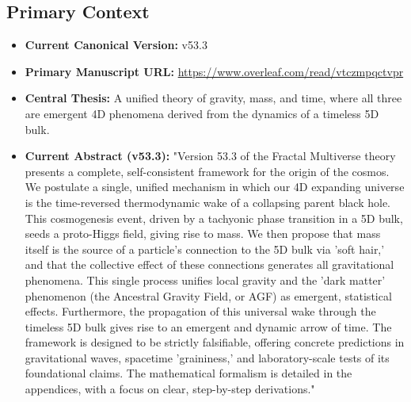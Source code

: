 \documentclass[aps,prd,onecolumn,10pt,superscriptaddress,nofootinbib,floatfix]{revtex4-2}
\begin{document}
\subsection{Primary Context}
\begin{itemize}
    \item \textbf{Current Canonical Version:} v53.3
    \item \textbf{Primary Manuscript URL:} \url{https://www.overleaf.com/read/vtczmpqctvpr}
    \item \textbf{Central Thesis:} A unified theory of gravity, mass, and time, where all three are emergent 4D phenomena derived from the dynamics of a timeless 5D bulk.
    \item \textbf{Current Abstract (v53.3):} "Version 53.3 of the Fractal Multiverse theory presents a complete, self-consistent framework for the origin of the cosmos. We postulate a single, unified mechanism in which our 4D expanding universe is the time-reversed thermodynamic wake of a collapsing parent black hole. This cosmogenesis event, driven by a tachyonic phase transition in a 5D bulk, seeds a proto-Higgs field, giving rise to mass. We then propose that mass itself is the source of a particle's connection to the 5D bulk via 'soft hair,' and that the collective effect of these connections generates all gravitational phenomena. This single process unifies local gravity and the 'dark matter' phenomenon (the Ancestral Gravity Field, or AGF) as emergent, statistical effects. Furthermore, the propagation of this universal wake through the timeless 5D bulk gives rise to an emergent and dynamic arrow of time. The framework is designed to be strictly falsifiable, offering concrete predictions in gravitational waves, spacetime 'graininess,' and laboratory-scale tests of its foundational claims. The mathematical formalism is detailed in the appendices, with a focus on clear, step-by-step derivations."
\end{itemize}
\end{document}
